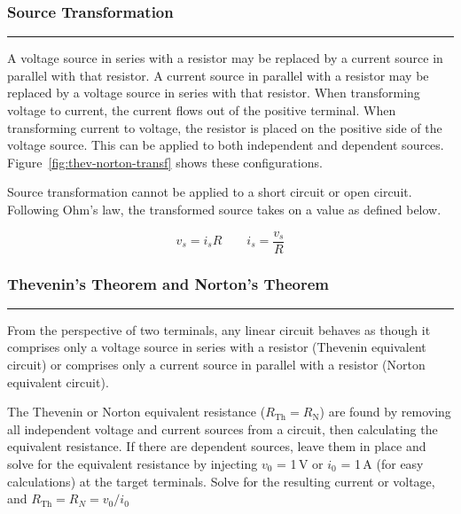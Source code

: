 \documentclass{article}
\begin{document}
    \smallskip
    \subsubsection*{Source Transformation}
    \vspace{-1em}
    \rule{\linewidth}{0.1mm}

    \smallskip\noindent
    A voltage source in series with a resistor may be replaced by a current source in parallel with that resistor.
    A current source in parallel with a resistor may be replaced by a voltage source in series with that resistor.
    When transforming voltage to current, the current flows out of the positive terminal.
    When transforming current to voltage, the resistor is placed on the positive side of the voltage source.
    This can be applied to both independent and dependent sources.
    Figure~\ref{fig:thev-norton-transf} shows these configurations.

    Source transformation cannot be applied to a short circuit or open circuit.
    Following Ohm's law, the transformed source takes on a value as defined below.

    \[
        v_s = i_s R     \qquad   i_s = \frac{v_s}{R}
    \]

    \smallskip
    \subsubsection*{Thevenin's Theorem and Norton's Theorem}
    \vspace{-1em}
    \rule{\linewidth}{0.1mm}

    \smallskip\noindent
    From the perspective of two terminals, any linear circuit behaves as though it comprises only a voltage source in series with a resistor (Thevenin equivalent circuit) or comprises only a current source in parallel with a resistor (Norton equivalent circuit).

    The Thevenin or Norton equivalent resistance ($R_\text{Th} = R_\text{N}$) are found by removing all independent voltage and current sources from a circuit, then calculating the equivalent resistance.
    If there are dependent sources, leave them in place and solve for the equivalent resistance by injecting $v_0$ = 1\,V or $i_0$ = 1\,A (for easy calculations) at the target terminals.
    Solve for the resulting current or voltage, and $R_\text{Th} = R_N = v_0/i_0$
\end{document}
